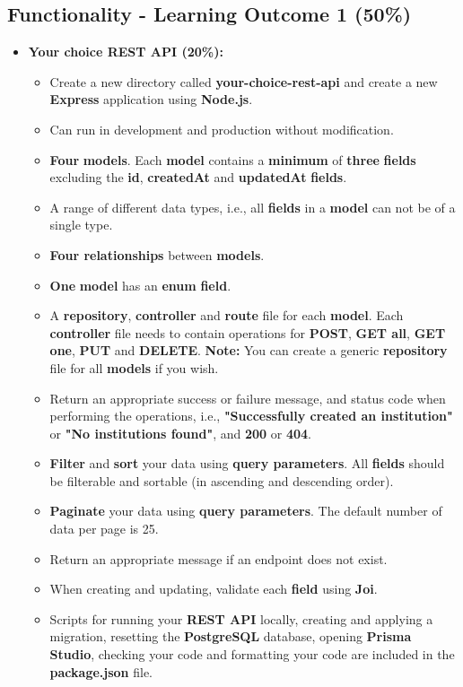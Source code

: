 \documentclass{article}
\begin{document}
\subsection*{Functionality - Learning Outcome 1 (50\%)}
\begin{itemize} 
	\item \textbf{Your choice REST API (20\%):}
	\begin{itemize}
		\item Create a new directory called \textbf{your-choice-rest-api} and create a new \textbf{Express} application using \textbf{Node.js}.
		\item Can run in development and production without modification.
		\item \textbf{Four} \textbf{models}. Each \textbf{model} contains a \textbf{minimum} of \textbf{three} \textbf{fields} excluding the \textbf{id}, \textbf{createdAt} and \textbf{updatedAt} \textbf{fields}.
		\item A range of different data types, i.e., all \textbf{fields} in a \textbf{model} can not be of a single type.
		\item \textbf{Four relationships} between \textbf{models}.
		\item \textbf{One} \textbf{model} has an \textbf{enum} \textbf{field}. 
		\item A \textbf{repository}, \textbf{controller} and \textbf{route} file for each \textbf{model}. Each \textbf{controller} file needs to contain operations for \textbf{POST}, \textbf{GET all}, \textbf{GET one}, \textbf{PUT} and \textbf{DELETE}. \textbf{Note:} You can create a generic \textbf{repository} file for all \textbf{models} if you wish.
		\item Return an appropriate success or failure message, and status code when performing the operations, i.e., \textbf{"Successfully created an institution"} or \textbf{"No institutions found"}, and \textbf{200} or \textbf{404}.
		\item \textbf{Filter} and \textbf{sort} your data using \textbf{query parameters}. All \textbf{fields} should be filterable and sortable (in ascending and descending order).
		\item \textbf{Paginate} your data using \textbf{query parameters}. The default number of data per page is 25.
		\item Return an appropriate message if an endpoint does not exist.
		\item When creating and updating, validate each \textbf{field} using \textbf{Joi}. 
		\item Scripts for running your \textbf{REST API} locally, creating and applying a migration, resetting the \textbf{PostgreSQL} database, opening \textbf{Prisma Studio}, checking your code and formatting your code are included in the \textbf{package.json} file.
	\end{itemize}


\end{itemize}
\end{document}
